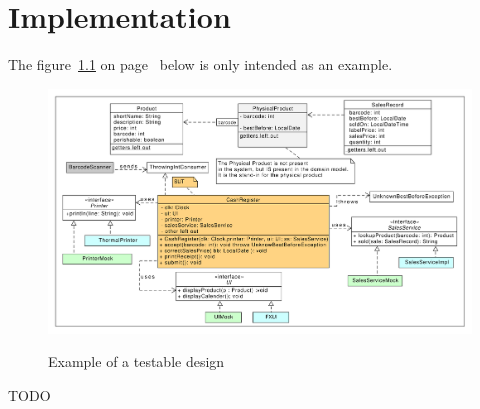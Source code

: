 \chapter{Implementation}


The figure~\ref{fig:testable-design} on page~\pageref{fig:testable-design} below is only intended as an example.

\begin{figure}[t]
\includegraphics[width=\linewidth]{images/testable-design.pdf}
\label{fig:testable-design}
\caption{Example of a testable design}
\end{figure}

TODO
